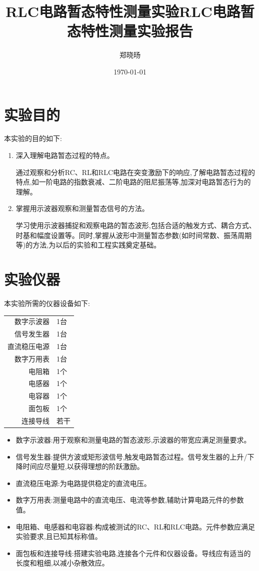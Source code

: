 \documentclass[UTF8]{ctexart}
\title{RLC电路暂态特性测量实验}
\title{RLC电路暂态特性测量实验报告}
\author{郑晓旸}
\date{\today}
\begin{document}
\fancyfoot[C]{\thepage}

\maketitle
\tableofcontents
\newpage

\section{实验目的}

本实验的目的如下:
\begin{enumerate}
    \item 深入理解电路暂态过程的特点。
    
    通过观察和分析RC、RL和RLC电路在突变激励下的响应,了解电路暂态过程的特点,如一阶电路的指数衰减、二阶电路的阻尼振荡等,加深对电路暂态行为的理解。

    \item 掌握用示波器观察和测量暂态信号的方法。
    
    学习使用示波器捕捉和观察电路的暂态波形,包括合适的触发方式、耦合方式、时基和幅度设置等。同时,掌握从波形中测量暂态参数(如时间常数、振荡周期等)的方法,为以后的实验和工程实践奠定基础。
\end{enumerate}

\section{实验仪器}


本实验所需的仪器设备如下:

\begin{tabular}{rl}
    数字示波器 & 1台 \\
    信号发生器 & 1台 \\
    直流稳压电源 & 1台 \\
    数字万用表 & 1台 \\
    电阻箱 & 1个 \\
    电感器 & 1个 \\
    电容器 & 1个 \\
    面包板 & 1个 \\
    连接导线 & 若干
\end{tabular}

\begin{itemize}
    \item 数字示波器:用于观察和测量电路的暂态波形,示波器的带宽应满足测量要求。
    \item 信号发生器:提供方波或矩形波信号,触发电路暂态过程。信号发生器的上升/下降时间应尽量短,以获得理想的阶跃激励。
    \item 直流稳压电源:为电路提供稳定的直流电压。
    \item 数字万用表:测量电路中的直流电压、电流等参数,辅助计算电路元件的参数值。
    \item 电阻箱、电感器和电容器:构成被测试的RC、RL和RLC电路。元件参数应满足实验要求,且已知其标称值。
    \item 面包板和连接导线:搭建实验电路,连接各个元件和仪器设备。导线应有适当的长度和粗细,以减小杂散效应。
\end{itemize}
\newpage
\end{document}
